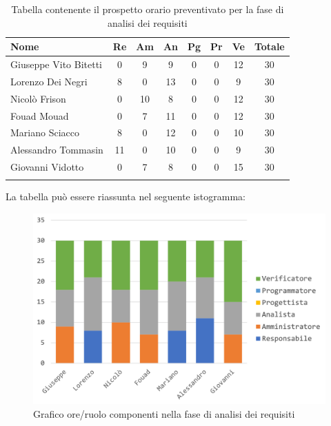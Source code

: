 			\begin{longtable}{|l|c|c|c|c|c|c|c|}
				\hline
				\rowcolor{lighter-grayer}
				\textbf{Nome} & \textbf{Re} & \textbf{Am} & \textbf{An} & \textbf{Pg}  & \textbf{Pr}   & \textbf{Ve} & \textbf{Totale} \\
				\hline
				\endfirsthead
				
				\hline
				Giuseppe Vito Bitetti & 0 & 9 & 9 & 0 & 0 & 12 & 30\\
				\hline
				\hline
				Lorenzo Dei Negri & 8 & 0 & 13 & 0 & 0 & 9 & 30\\
				\hline
				\hline
				Nicolò Frison & 0 & 10 & 8 & 0 & 0 & 12 & 30\\
				\hline
				\hline
				Fouad Mouad & 0 & 7 & 11 & 0 & 0 & 12 & 30\\
				\hline
				\hline
				Mariano Sciacco & 8 & 0 & 12 & 0 & 0 & 10 & 30\\
				\hline
				\hline
				Alessandro Tommasin & 11 & 0 & 10 & 0 & 0 & 9 & 30\\
				\hline
				\hline
				Giovanni Vidotto & 0 & 7 & 8 & 0 & 0 & 15 & 30\\
				\hline 
				\caption{Tabella contenente il prospetto orario preventivato per la fase di analisi dei requisiti}
			\end{longtable}
			\pagebreak
		
			La tabella può essere riassunta nel seguente istogramma:
		
			\begin{figure}[H]
				\centering
				\includegraphics[width=0.8\linewidth]{./images/preventivo/analisi1.png}
				\caption{Grafico ore/ruolo componenti nella fase di analisi dei requisiti}
				\label{fig:grafico suddivione ruoli fase analisi dei requisiti}
			\end{figure}
		
